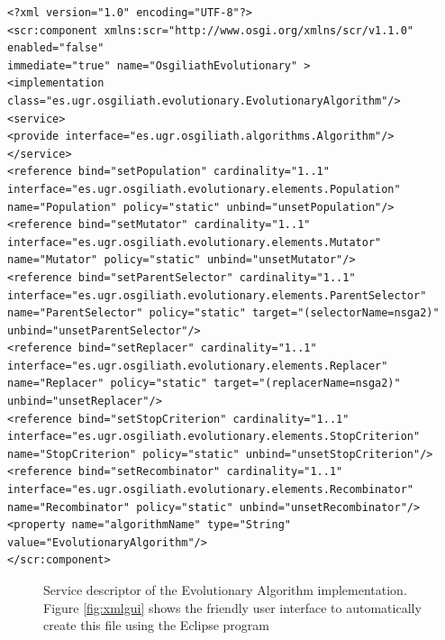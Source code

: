 \newsavebox{\mintedboxDS}
\begin{lrbox}{\mintedboxDS}
\begin{minipage}{10cm}
\begin{verbatim}
<?xml version="1.0" encoding="UTF-8"?>
<scr:component xmlns:scr="http://www.osgi.org/xmlns/scr/v1.1.0" enabled="false"
immediate="true" name="OsgiliathEvolutionary" >
<implementation class="es.ugr.osgiliath.evolutionary.EvolutionaryAlgorithm"/>
<service>
<provide interface="es.ugr.osgiliath.algorithms.Algorithm"/>
</service>
<reference bind="setPopulation" cardinality="1..1"
interface="es.ugr.osgiliath.evolutionary.elements.Population"
name="Population" policy="static" unbind="unsetPopulation"/>
<reference bind="setMutator" cardinality="1..1"
interface="es.ugr.osgiliath.evolutionary.elements.Mutator"
name="Mutator" policy="static" unbind="unsetMutator"/>
<reference bind="setParentSelector" cardinality="1..1"
interface="es.ugr.osgiliath.evolutionary.elements.ParentSelector"
name="ParentSelector" policy="static" target="(selectorName=nsga2)" 
unbind="unsetParentSelector"/>
<reference bind="setReplacer" cardinality="1..1"
interface="es.ugr.osgiliath.evolutionary.elements.Replacer"
name="Replacer" policy="static" target="(replacerName=nsga2)" 
unbind="unsetReplacer"/>
<reference bind="setStopCriterion" cardinality="1..1"
interface="es.ugr.osgiliath.evolutionary.elements.StopCriterion"
name="StopCriterion" policy="static" unbind="unsetStopCriterion"/>
<reference bind="setRecombinator" cardinality="1..1"
interface="es.ugr.osgiliath.evolutionary.elements.Recombinator"
name="Recombinator" policy="static" unbind="unsetRecombinator"/>
<property name="algorithmName" type="String" value="EvolutionaryAlgorithm"/>
</scr:component>
\end{verbatim}
\end{minipage}
\end{lrbox} %

\begin{figure}
\usebox{\mintedboxDS}
\caption{Service descriptor of the Evolutionary Algorithm implementation.  Figure \ref{fig:xmlgui} shows the friendly user interface to automatically create this file using the Eclipse program} 
\label{fig:ds} 
\end{figure}

